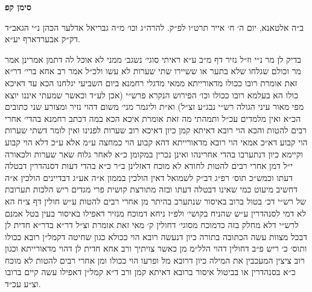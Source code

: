 \documentclass[12pt, openany]{book}
\newcommand{\chapname}{}
\newcommand{\newchap}[1]{
	\addcontentsline{toc}{chapter}{#1}
	\renewcommand{\chapname}{#1}
		\begin{center}
			\textbf{%
\fontsize{16pt}{16pt}\selectfont
				#1}
		\end{center}
}
\begin{document}
\begin{multicols}{2}
\end{multicols}\newpage

\newchap{סימן קפ}
\begin{multicols}{2}
ב״ה אלטאנא, יום ה׳ ח׳ אייר תרט״ו לפ״ק. להרה״ג וכו׳ מ״ה גבריאל אדלער הכהן נ״י הגאב״ד דק״ק אבערדארף יע״א.\\\vspace{0pt}

בדיק לן מר נ״י וז״ל נזיר דף מ״ב ע״א ראיתי סוגי׳ נשגב׳ ממני לא אוכל לה דתמן אמרינן אמר מר וכולם שגלחו שלא בתער או ששיירו שתי שערות לא עשו ולכ״ל אמר רב אחא ברי׳ דר״א זאת אומרת רובו ככולו מדאורייתא ממאי מדגלי רחמנא ביום השביעי יגלחנו הכא עד דאיכא כולו הא בעלמא רובו ככולו וכו׳ הפירוש הנקרא פרש״י (אכן לע״ד וכאשר שמעתי איננו יוצא מפי מאור עיני הגולה רש״י נבג״ע זצ״ל) וא״ת וליגמר מני׳ משום דהוי נזיר ומצורע שני כתובים הכ״א ואין מלמדים עכ״ל ותמהתי מה זאת אומרת איכא הכא במה דכתב רחמנא בהדי׳ אחרי רבים להטות והכא הוי רובא דאיתא קמן כיון דאיכא רוב שערות לפנינו ואין לומר דשתי שערות הוי קבוע דא״כ אמאי הוי רובא מדאורייתא דהא קבוע הוי כמחצה ע״מ אלא ע״כ דלא הוי קבוע וקיימא כיון דנתערבו בהדי אחרינהו ואינן נכרין במקומן כ״א לאחר גלוח שאר שערות ולכאורה י״ל דמן אחרי רבים להטות לחודא לא מוכח דאזלינן ב״ר כ״א בהדי דעות דסנהדרין דבטלה דעתו וכמש״כ תוס׳ רפ״ג דב״ק לשמואל דאין הולכין בממון א״ה אע״ג דבדיינים הולכין א״ה דחשיב מיעוט כמי שאינו דבטלה דעתו ובזה מתורצת קושית פרי מגדים ריש הלכות תערובת של רש״י דכ׳ בטול ברוב באיסור שנתערב בהיתר מן אחרי רבים להטות ע״ש חולין דף צ״ח הא לא דמי לסנהדרין ע״ש שהניח בקושי׳ ולפ״ז ניחא דמוכח מנזיר דאפילו באיסור בעין בטל אמנם לרש״י דלא מחלק בזה כדמוכח מסוגי׳ דחולין ק׳ מאי זאת אומרת וצ״ל דר״א בדר״א חדית לן דבכל מצוות עשה הכתובה בתורה כיון דנעשה רובא הוי ככולא כגון שחיטה דקמל״ן רובא ככולו ותוס׳ כ׳ ריש פ״ב דחולין דהוי הלל״מ מן כאשר צויתיך ורב אחא חדית לן דהוי מדאורייתא וכגון רוב ציצין המעכבין את המילה כיון דרובא מל ופרעו הוי ככולו ומן אחרי רבים להטות לא מוכח כ״א בסנהדרין או בביטול איסור ברובא דאיתא קמן ורב ד״א קמל״ן דאפילו עשה קיים ברובו וצ״ע עכ״ד.\\\vspace{0pt}


\end{multicols}
\end{document}

